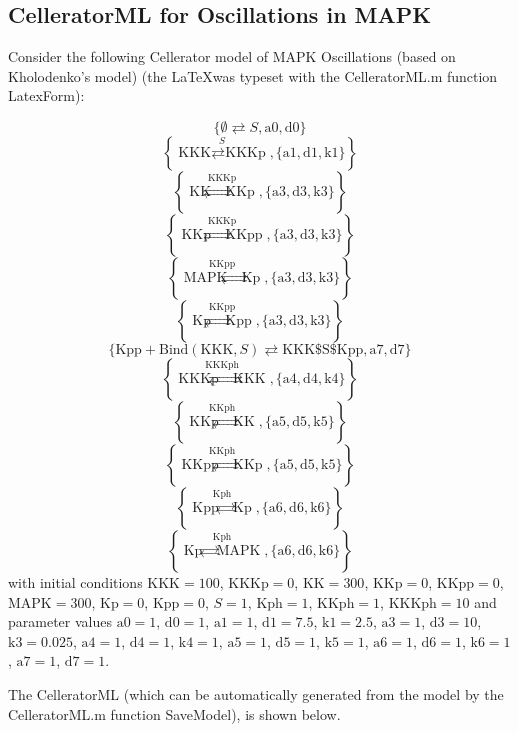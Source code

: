 \documentclass[12pt,letterpaper]{article}
\begin{document}
\subsection{CelleratorML for Oscillations in MAPK}

Consider the following Cellerator model of MAPK Oscillations (based on Kholodenko's model) (the \LaTeX was typeset with the CelleratorML.m function LatexForm): 


$$\{\emptyset \rightleftarrows S,\text{a0},\text{d0}\}$$
$$\left\{\overset{S}{\text{KKK}\rightleftarrows \text{KKKp}},\{\text{a1},\text{d1},\text{k1}\}\right\}$$
$$\left\{\overset{\text{KKKp}}{\text{KK}\rightleftarrows \text{KKp}},\{\text{a3},\text{d3},\text{k3}\}\right\}$$
$$\left\{\overset{\text{KKKp}}{\text{KKp}\rightleftarrows \text{KKpp}},\{\text{a3},\text{d3},\text{k3}\}\right\}$$
$$\left\{\overset{\text{KKpp}}{\text{MAPK}\rightleftarrows \text{Kp}},\{\text{a3},\text{d3},\text{k3}\}\right\}$$
$$\left\{\overset{\text{KKpp}}{\text{Kp}\rightleftarrows \text{Kpp}},\{\text{a3},\text{d3},\text{k3}\}\right\}$$
$$\{\text{Kpp}+\text{Bind}(\text{KKK},S)\rightleftarrows \text{KKK$\$$S$\$$Kpp},\text{a7},\text{d7}\}$$
$$\left\{\overset{\text{KKKph}}{\text{KKKp}\rightleftarrows \text{KKK}},\{\text{a4},\text{d4},\text{k4}\}\right\}$$
$$\left\{\overset{\text{KKph}}{\text{KKp}\rightleftarrows \text{KK}},\{\text{a5},\text{d5},\text{k5}\}\right\}$$
$$\left\{\overset{\text{KKph}}{\text{KKpp}\rightleftarrows \text{KKp}},\{\text{a5},\text{d5},\text{k5}\}\right\}$$
$$\left\{\overset{\text{Kph}}{\text{Kpp}\rightleftarrows \text{Kp}},\{\text{a6},\text{d6},\text{k6}\}\right\}$$
$$\left\{\overset{\text{Kph}}{\text{Kp}\rightleftarrows \text{MAPK}},\{\text{a6},\text{d6},\text{k6}\}\right\}$$
with initial conditions  $\text{KKK}=100$,
$\text{KKKp}=0$,
$\text{KK}=300$,
$\text{KKp}=0$,
$\text{KKpp}=0$,
$\text{MAPK}=300$,
$\text{Kp}=0$,
$\text{Kpp}=0$,
$S=1$,
$\text{Kph}=1$,
$\text{KKph}=1$,
$\text{KKKph}=10$ and parameter values $\text{a0}=1$,
$\text{d0}=1$,
$\text{a1}=1$,
$\text{d1}=7.5$,
$\text{k1}=2.5$,
$\text{a3}=1$,
$\text{d3}=10$,
$\text{k3}=0.025$,
$\text{a4}=1$,
$\text{d4}=1$,
$\text{k4}=1$,
$\text{a5}=1$,
$\text{d5}=1$,
$\text{k5}=1$,
$\text{a6}=1$,
$\text{d6}=1$,
$\text{k6}=1$,
$\text{a7}=1$,
$\text{d7}=1$.

The CelleratorML (which can be automatically generated from the model by the CelleratorML.m function SaveModel), is shown below.
\end{document}
